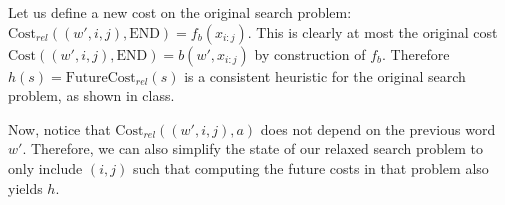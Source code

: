 \item {}

Let us define a new cost on the original search problem: $\text{Cost}_{rel}
((w', i, j), \text{END}) = f_b(x_{i:j})$. This is clearly at most the original
cost $\text{Cost}((w', i, j), \text{END}) = b(w', x_{i:j})$ by construction of
$f_b$. Therefore $h(s) = \text{FutureCost}_{rel}(s)$ is a consistent heuristic
for the original search problem, as shown in class.

Now, notice that $\text{Cost}_{rel}((w', i, j), a)$ does not depend on the
previous word $w'$. Therefore, we can also simplify the state of our relaxed
search problem to only include $(i, j)$ such that computing the future costs in
that problem also yields $h$.
